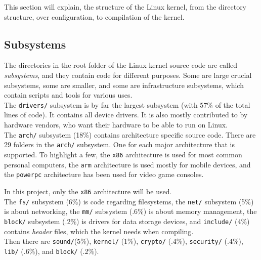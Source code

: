 \documentclass[a4paper,11pt]{report}
\newcommand{\figa}{
    \begin{figure}[!htpb]
    \centering
}
\newcommand{\figb}[2]{
    \caption{#1}
    \label{#2}
    \end{figure}
}
\begin{document}
This section will explain, the structure of the Linux kernel, from the 
directory structure, over configuration, to compilation of the kernel.


            \subsection{Subsystems}
            \label{sec:linuxss}

The directories in the root folder of the Linux kernel source code are called 
\emph{subsystems}, and they contain code for different purposes. Some are large 
crucial subsystems, some are smaller, and some are infrastructure 
subsystems, which contain scripts and tools for various uses\cite{42bugs}.
\\

The \texttt{drivers/} subsystem is by far the largest subsystem (with 57\% of 
the total lines of code). It contains all device drivers. It is also mostly 
contributed to by hardware vendors, who want their hardware to be able to run 
on Linux.
\\

The \texttt{arch/} subsystem (18\%) contains architecture specific source code. 
There are 29 folders in the \texttt{arch/} subsystem. One for each major 
architecture that is supported. To highlight a few, the \texttt{x86} 
architecture is used for most common personal computers, the \texttt{arm} 
architecture is used mostly for mobile devices, and the \texttt{powerpc} 
architecture has been used for video game consoles.

In this project, only the \texttt{x86} architecture will be used.
\\

The \texttt{fs/} subsystem (6\%) is code regarding filesystems, the 
\texttt{net/} subsystem (5\%) is about networking, the \texttt{mm/} 
subsystem (.6\%) is about memory management, the \texttt{block/} subsystem 
(.2\%) is drivers for data storage devices, and \texttt{include/} (4\%) 
contains \emph{header} files, which the kernel needs when 
compiling\cite{linuxorg}.
\\

Then there are \texttt{sound/}(5\%),  \texttt{kernel/} 
(1\%), \texttt{crypto/} (.4\%), \texttt{security/}  (.4\%), \texttt{lib/} 
(.6\%), and \texttt{block/} (.2\%).
\\
\end{document}
